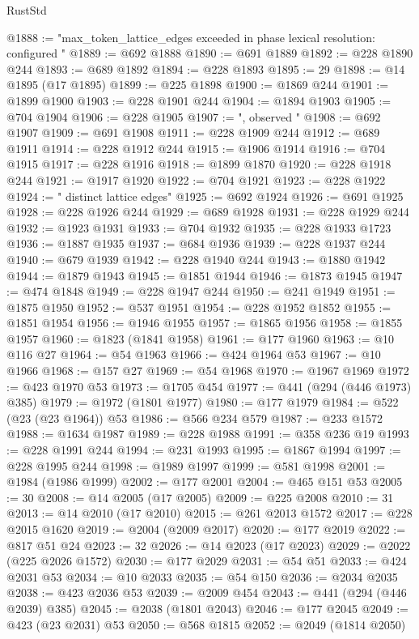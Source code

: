 \begin{lexlean}{RustStd}
\begin{coremodule}
@1888 := "max_token_lattice_edges exceeded in phase lexical resolution: configured "
@1889 := @692 @1888
@1890 := @691 @1889
@1892 := @228 @1890 @244
@1893 := @689 @1892
@1894 := @228 @1893
@1895 := 29
@1898 := @14 @1895 (@17 @1895)
@1899 := @225 @1898
@1900 := @1869 @244
@1901 := @1899 @1900
@1903 := @228 @1901 @244
@1904 := @1894 @1903
@1905 := @704 @1904
@1906 := @228 @1905
@1907 := ", observed "
@1908 := @692 @1907
@1909 := @691 @1908
@1911 := @228 @1909 @244
@1912 := @689 @1911
@1914 := @228 @1912 @244
@1915 := @1906 @1914
@1916 := @704 @1915
@1917 := @228 @1916
@1918 := @1899 @1870
@1920 := @228 @1918 @244
@1921 := @1917 @1920
@1922 := @704 @1921
@1923 := @228 @1922
@1924 := " distinct lattice edges"
@1925 := @692 @1924
@1926 := @691 @1925
@1928 := @228 @1926 @244
@1929 := @689 @1928
@1931 := @228 @1929 @244
@1932 := @1923 @1931
@1933 := @704 @1932
@1935 := @228 @1933 @1723
@1936 := @1887 @1935
@1937 := @684 @1936
@1939 := @228 @1937 @244
@1940 := @679 @1939
@1942 := @228 @1940 @244
@1943 := @1880 @1942
@1944 := @1879 @1943
@1945 := @1851 @1944
@1946 := @1873 @1945
@1947 := @474 @1848
@1949 := @228 @1947 @244
@1950 := @241 @1949
@1951 := @1875 @1950
@1952 := @537 @1951
@1954 := @228 @1952 @1852
@1955 := @1851 @1954
@1956 := @1946 @1955
@1957 := @1865 @1956
@1958 := @1855 @1957
@1960 := @1823 (@1841 @1958)
@1961 := @177 @1960
@1963 := @10 @116 @27
@1964 := @54 @1963
@1966 := @424 @1964 @53
@1967 := @10 @1966
@1968 := @157 @27
@1969 := @54 @1968
@1970 := @1967 @1969
@1972 := @423 @1970 @53
@1973 := @1705 @454
@1977 := @441 (@294 (@446 @1973) @385)
@1979 := @1972 (@1801 @1977)
@1980 := @177 @1979
@1984 := @522 (@23 (@23 @1964)) @53
@1986 := @566 @234 @579
@1987 := @233 @1572
@1988 := @1634 @1987
@1989 := @228 @1988
@1991 := @358 @236 @19
@1993 := @228 @1991 @244
@1994 := @231 @1993
@1995 := @1867 @1994
@1997 := @228 @1995 @244
@1998 := @1989 @1997
@1999 := @581 @1998
@2001 := @1984 (@1986 @1999)
@2002 := @177 @2001
@2004 := @465 @151 @53
@2005 := 30
@2008 := @14 @2005 (@17 @2005)
@2009 := @225 @2008
@2010 := 31
@2013 := @14 @2010 (@17 @2010)
@2015 := @261 @2013 @1572
@2017 := @228 @2015 @1620
@2019 := @2004 (@2009 @2017)
@2020 := @177 @2019
@2022 := @817 @51 @24
@2023 := 32
@2026 := @14 @2023 (@17 @2023)
@2029 := @2022 (@225 @2026 @1572)
@2030 := @177 @2029
@2031 := @54 @51
@2033 := @424 @2031 @53
@2034 := @10 @2033
@2035 := @54 @150
@2036 := @2034 @2035
@2038 := @423 @2036 @53
@2039 := @2009 @454
@2043 := @441 (@294 (@446 @2039) @385)
@2045 := @2038 (@1801 @2043)
@2046 := @177 @2045
@2049 := @423 (@23 @2031) @53
@2050 := @568 @1815
@2052 := @2049 (@1814 @2050)

\end{coremodule}
\end{lexlean}
